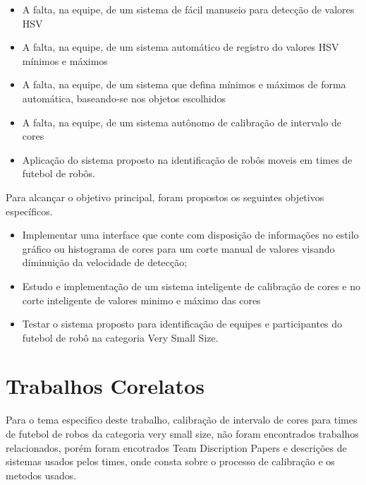 \begin{itemize}

	\item A falta, na equipe, de um sistema de fácil manuseio para detecção de valores HSV
	\item A falta, na equipe, de um sistema automático de registro do valores HSV mínimos e máximos
	\item A falta, na equipe, de um sistema que defina mínimos e máximos de forma automática, baseando-se nos objetos escolhidos
	\item A falta, na equipe, de um sistema autônomo de calibração de intervalo de cores
	\item Aplicação do sistema proposto na identificação de robôs moveis em times de futebol de robôs.
	
			

\end{itemize}

Para alcançar o objetivo principal, foram propostos os seguintes objetivos específicos.

\begin{itemize}
	
	\item Implementar uma interface que conte com disposição de informações no estilo gráfico ou histograma de cores para um corte manual de valores
	visando diminuição da velocidade de detecção; 
	\item Estudo e implementação de um sistema inteligente de calibração de cores e no corte inteligente de valores minimo e máximo das cores
	\item Testar o sistema proposto para identificação de equipes e participantes do futebol 
	de robô na categoria Very Small Size. 
	
	
\end{itemize}

\newpage

\section{Trabalhos Corelatos}
Para o tema especifico deste trabalho, calibração de intervalo de cores para times de futebol de robos da categoria very small size, não foram encontrados trabalhos relacionados, porém foram encotrados Team Discription Papers e descrições de sistemas usados pelos times, onde consta sobre o processo de calibração e os metodos usados.

